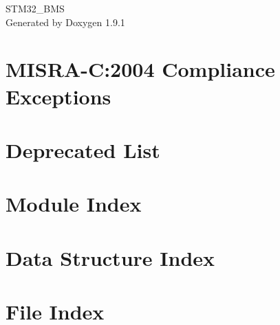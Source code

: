 \let\mypdfximage\pdfximage\def\pdfximage{\immediate\mypdfximage}\documentclass[twoside]{book}
\newcommand{\+}{\discretionary{\mbox{\scriptsize$\hookleftarrow$}}{}{}}
\newcommand{\clearemptydoublepage}{%
  \newpage{\pagestyle{empty}\cleardoublepage}%
}
\begin{document}
\raggedbottom

\hypersetup{pageanchor=false,
             bookmarksnumbered=true,
             pdfencoding=unicode
            }
\begin{titlepage}
\vspace*{7cm}
\begin{center}%
{\Large STM32\+\_\+\+BMS }\\
\vspace*{1cm}
{\large Generated by Doxygen 1.9.1}\\
\end{center}
\end{titlepage}
\clearemptydoublepage
{}
\tableofcontents
\clearemptydoublepage
{}
\hypersetup{pageanchor=true}

\chapter{MISRA-\/C\+:2004 Compliance Exceptions}
\label{CMSIS_MISRA_Exceptions}

\chapter{Deprecated List}
\label{deprecated}

\chapter{Module Index}

\chapter{Data Structure Index}

\chapter{File Index}

\end{document}
